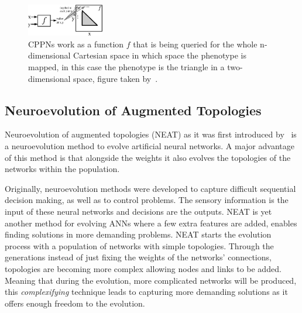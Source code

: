 \documentclass{sig-alternate}
\begin{document}
\begin{figure}[t!]
\centering
\includegraphics[width=0.3\textwidth]{../Figures/Misc/cppnResolution.eps}
\caption{CPPNs work as a function $f$ that is being queried for the whole n-dimensional Cartesian space in which space the phenotype is mapped, in this case the phenotype is the triangle in a two-dimensional space, figure taken by~\cite{stanley2007compositional}.}
\label{fig:cppnResolution}
\end{figure}

\subsection{Neuroevolution of Augmented Topologies}

Neuroevolution of augmented topologies (NEAT) as it was first introduced by~\cite{stanley2002evolving} is a neuroevolution method to evolve artificial neural networks. A major advantage of this method is that alongside the weights it also evolves the topologies of the networks within the population.

Originally, neuroevolution methods were developed to capture difficult sequential decision making, as well as to control problems. The sensory information is the input of these neural networks and decisions are the outputs. NEAT is yet another method for evolving ANNs where a few extra features are added, enables finding solutions in more demanding problems. NEAT starts the evolution process with a population of networks with simple topologies. Through the generations instead of just fixing the weights of the networks' connections, topologies are becoming more complex allowing nodes and links to be added. Meaning that during the evolution, more complicated networks will be produced, this \emph{complexifying} technique leads to capturing more demanding solutions as it offers enough freedom to the evolution.
\end{document}
